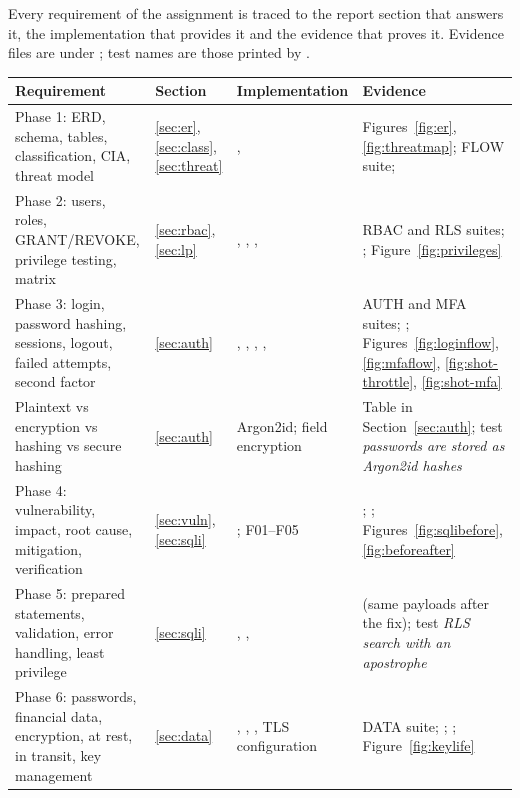 Every requirement of the assignment is traced to the report section that answers it, the implementation that provides it and the evidence that proves it. Evidence files are under ; test names are those printed by .
\begin{center}\scriptsize
\begin{longtable}{@{}L{3.6cm}L{1.3cm}L{4.6cm}L{6.4cm}@{}}
\toprule\textbf{Requirement} & \textbf{Section} & \textbf{Implementation} & \textbf{Evidence}\\\midrule\endhead
Phase 1: ERD, schema, tables, classification, CIA, threat model & \ref{sec:er}, \ref{sec:class}, \ref{sec:threat} & ,  & Figures~\ref{fig:er}, \ref{fig:threatmap}; FLOW suite; \\
Phase 2: users, roles, GRANT/REVOKE, privilege testing, matrix & \ref{sec:rbac}, \ref{sec:lp} & , , ,  & RBAC and RLS suites; ; Figure~\ref{fig:privileges}\\
Phase 3: login, password hashing, sessions, logout, failed attempts, second factor & \ref{sec:auth} & , , , ,  & AUTH and MFA suites; ; Figures~\ref{fig:loginflow}, \ref{fig:mfaflow}, \ref{fig:shot-throttle}, \ref{fig:shot-mfa}\\
Plaintext vs encryption vs hashing vs secure hashing & \ref{sec:auth} & Argon2id; field encryption & Table in Section~\ref{sec:auth}; test \emph{passwords are stored as Argon2id hashes}\\
Phase 4: vulnerability, impact, root cause, mitigation, verification & \ref{sec:vuln}, \ref{sec:sqli} & ; F01--F05 & ; ; Figures~\ref{fig:sqlibefore}, \ref{fig:beforeafter}\\
Phase 5: prepared statements, validation, error handling, least privilege & \ref{sec:sqli} & , ,  &  (same payloads after the fix); test \emph{RLS search with an apostrophe}\\
Phase 6: passwords, financial data, encryption, at rest, in transit, key management & \ref{sec:data} & , , , TLS configuration & DATA suite; ; ; Figure~\ref{fig:keylife}\\

\end{longtable}
\end{center}
